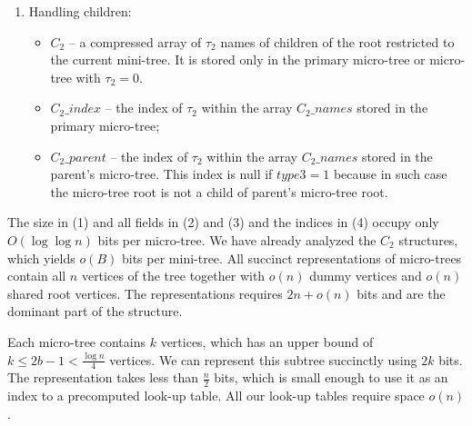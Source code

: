 \begin{enumerate}
	\item Handling children:
	\begin{itemize}
		\item $C_2$ -- a compressed array of $\tau_2$ names of children of the root restricted to the current mini-tree.
		It is stored only in the primary micro-tree or micro-tree with $\tau_2 = 0$.
		\item $C_2\_index$ -- the index of $\tau_2$ within the array $C_2\_names$ stored in the primary micro-tree;
		\item $C_2\_parent$ -- the index of $\tau_2$ within the array $C_2\_names$ stored in the parent's micro-tree.
		This index is null if $type3 = 1$ because in such case the micro-tree root is not a child of parent's micro-tree root.
	\end{itemize}
\end{enumerate}

The size in (1) and all fields in (2) and (3) and the indices in (4) occupy only $O(\log \log n)$ bits per micro-tree.
We have already analyzed the $C_2$ structures, which yields $o(B)$ bits per mini-tree.
All succinct representations of micro-trees contain all $n$ vertices of the tree together with $o(n)$ dummy vertices and $o(n)$ shared root vertices.
The representations requires $2n + o(n)$ bits and are the dominant part of the structure.

Each micro-tree contains $k$ vertices, which has an upper bound of $ k \le 2b - 1 < \frac{\log n}{4}$ vertices.
We can represent this subtree succinctly using $2k$ bits.
The representation takes less than $\frac{n}{2}$ bits, which is small enough to use it as an index to a precomputed look-up table.
All our look-up tables require space $o(n)$.

\bigskip

